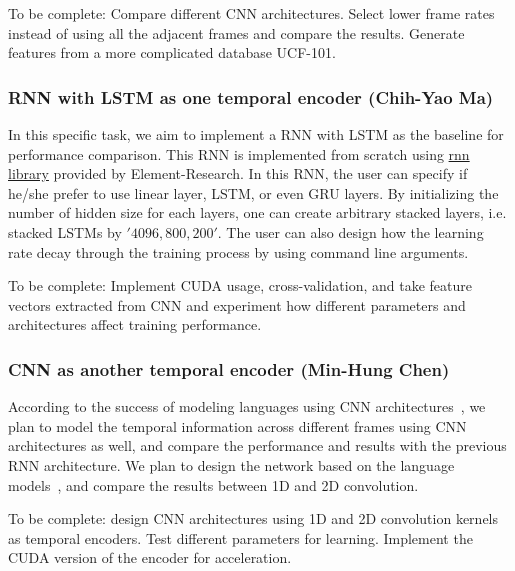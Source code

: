 To be complete: Compare different CNN architectures. Select lower frame rates instead of using all the adjacent frames and compare the results. Generate features from a more complicated database UCF-101.

\subsubsection*{RNN with LSTM as one temporal encoder (Chih-Yao Ma)}
In this specific task, we aim to implement a RNN with LSTM as the baseline for performance comparison. This RNN is implemented from scratch using \href{https://github.com/Element-Research/rnn}{rnn library} provided by Element-Research. In this RNN, the user can specify if he/she prefer to use linear layer, LSTM, or even GRU layers. By initializing the number of hidden size for each layers, one can create arbitrary stacked layers, i.e. stacked LSTMs by ${'4096, 800, 200'}$. The user can also design how the learning rate decay through the training process by using command line arguments. 

To be complete: Implement CUDA usage, cross-validation, and take feature vectors extracted from CNN and experiment how different parameters and architectures affect training performance. 

\subsubsection*{CNN as another temporal encoder (Min-Hung Chen)}
According to the success of modeling languages using CNN architectures~\cite{cnnSC,cnnMNLS}, we plan to model the temporal information across different frames using CNN architectures as well, and compare the performance and results with the previous RNN architecture. We plan to design the network based on the language models~\cite{cnnSC,cnnMNLS}, and compare the results between 1D and 2D convolution. 

To be complete: design CNN architectures using 1D and 2D convolution kernels as temporal encoders. Test different parameters for learning. Implement the CUDA version of the encoder for acceleration.


